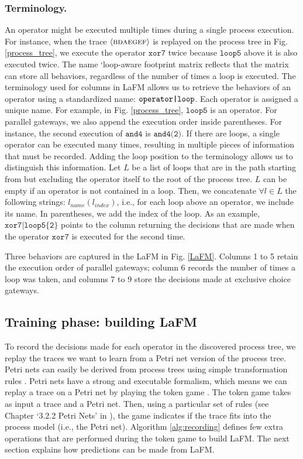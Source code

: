 \documentclass[runningheads]{llncs}
\begin{document}
\subsubsection{Terminology.}
An operator might be executed multiple times during a single process execution. For instance, when the trace $\langle \textsc{bdaegef} \rangle$ is replayed on the process tree in Fig. \ref{process_tree}, we execute the operator $\texttt{xor7}$ twice because $\texttt{loop5}$ above it is also executed twice. The name ‘loop-aware footprint matrix reflects that the matrix can store all behaviors, regardless of the number of times a loop is executed. The terminology used for columns in LaFM allows us to retrieve the behaviors of an operator using a standardized name: {$\texttt{operator\textbf{\textbar}loop}$}. Each operator is assigned a unique name. For example, in Fig. \ref{process_tree}, $\texttt{loop5}$ is an operator. For parallel gateways, we also append the execution order inside parentheses. For instance, the second execution of $\texttt{and4}$ is $\texttt{and4(2)}$. If there are loops, a single operator can be executed many times, resulting in multiple pieces of information that must be recorded. Adding the loop position to the terminology allows us to distinguish this information. Let $L$ be a list of loops that are in the path starting from but excluding the operator itself to the root of the process tree. $L$ can be empty if an operator is not contained in a loop. Then, we concatenate $\forall l \in L$ the following strings: $l_{name}(l_{index})$, i.e., for each loop above an operator, we include its name. In parentheses, we add the index of the loop. As an example, $\texttt{xor7|loop5\{2\}}$ points to the column returning the decisions that are made when the operator $\texttt{xor7}$ is executed for the second time.

Three behaviors are captured in the LaFM in Fig. \ref{LaFM}. Columns 1 to 5 retain the execution order of parallel gateways; column 6 records the number of times a loop was taken, and columns 7 to 9 store the decisions made at exclusive choice gateways. 

\subsection{Training phase: building LaFM} \label{Section:buildingPhase}
To record the decisions made for each operator in the discovered process tree, we replay the traces we want to learn from a Petri net version of the process tree. Petri nets can easily be derived from process trees using simple transformation rules \cite{leemans2013discovering}. Petri nets have a strong and executable formalism, which means we can replay a trace on a Petri net by playing the token game \cite{leemans2017robust}. The token game takes as input a trace and a Petri net. Then, using a particular set of rules (see Chapter `3.2.2 Petri Nets' in \cite{van2016process}), the game indicates if the trace fits into the process model (i.e., the Petri net). Algorithm \ref{alg:recording} defines few extra operations that are performed during the token game to build LaFM. The next section explains how predictions can be made from LaFM.
\end{document}
